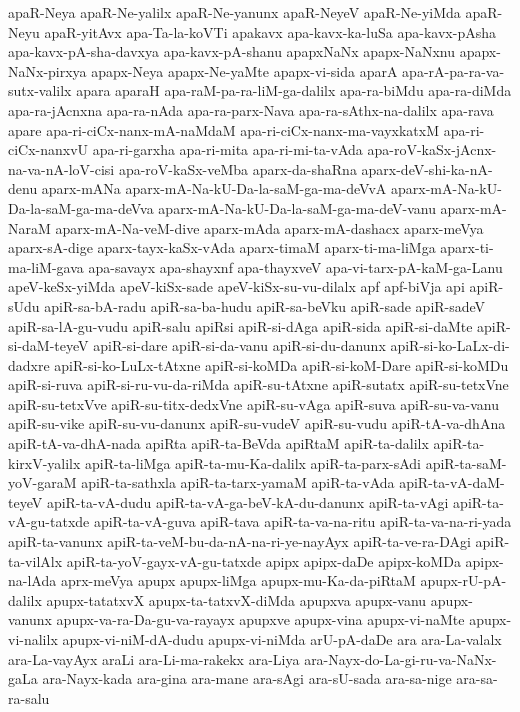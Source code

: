 {apaR-Neya
apaR-Ne-yalilx
apaR-Ne-yanunx
apaR-NeyeV
apaR-Ne-yiMda
apaR-Neyu
apaR-yitAvx
apa-Ta-la-koVTi
apakavx
apa-kavx-ka-luSa
apa-kavx-pAsha
apa-kavx-pA-sha-davxya
apa-kavx-pA-shanu
apapxNaNx
apapx-NaNxnu
apapx-NaNx-pirxya
apapx-Neya
apapx-Ne-yaMte
apapx-vi-sida
aparA
apa-rA-pa-ra-va-sutx-valilx
apara
aparaH
apa-raM-pa-ra-liM-ga-dalilx
apa-ra-biMdu
apa-ra-diMda
apa-ra-jAcnxna
apa-ra-nAda
apa-ra-parx-Nava
apa-ra-sAthx-na-dalilx
apa-rava
apare
apa-ri-ciCx-nanx-mA-naMdaM
apa-ri-ciCx-nanx-ma-vayxkatxM
apa-ri-ciCx-nanxvU
apa-ri-garxha
apa-ri-mita
apa-ri-mi-ta-vAda
apa-roV-kaSx-jAcnx-na-va-nA-loV-cisi
apa-roV-kaSx-veMba
aparx-da-shaRna
aparx-deV-shi-ka-nA-denu
aparx-mANa
aparx-mA-Na-kU-Da-la-saM-ga-ma-deVvA
aparx-mA-Na-kU-Da-la-saM-ga-ma-deVva
aparx-mA-Na-kU-Da-la-saM-ga-ma-deV-vanu
aparx-mA-NaraM
aparx-mA-Na-veM-dive
aparx-mAda
aparx-mA-dashacx
aparx-meVya
aparx-sA-dige
aparx-tayx-kaSx-vAda
aparx-timaM
aparx-ti-ma-liMga
aparx-ti-ma-liM-gava
apa-savayx
apa-shayxnf
apa-thayxveV
apa-vi-tarx-pA-kaM-ga-Lanu
apeV-keSx-yiMda
apeV-kiSx-sade
apeV-kiSx-su-vu-dilalx
apf
apf-biVja
api
apiR-sUdu
apiR-sa-bA-radu
apiR-sa-ba-hudu
apiR-sa-beVku
apiR-sade
apiR-sadeV
apiR-sa-lA-gu-vudu
apiR-salu
apiRsi
apiR-si-dAga
apiR-sida
apiR-si-daMte
apiR-si-daM-teyeV
apiR-si-dare
apiR-si-da-vanu
apiR-si-du-danunx
apiR-si-ko-LaLx-di-dadxre
apiR-si-ko-LuLx-tAtxne
apiR-si-koMDa
apiR-si-koM-Dare
apiR-si-koMDu
apiR-si-ruva
apiR-si-ru-vu-da-riMda
apiR-su-tAtxne
apiR-sutatx
apiR-su-tetxVne
apiR-su-tetxVve
apiR-su-titx-dedxVne
apiR-su-vAga
apiR-suva
apiR-su-va-vanu
apiR-su-vike
apiR-su-vu-danunx
apiR-su-vudeV
apiR-su-vudu
apiR-tA-va-dhAna
apiR-tA-va-dhA-nada
apiRta
apiR-ta-BeVda
apiRtaM
apiR-ta-dalilx
apiR-ta-kirxV-yalilx
apiR-ta-liMga
apiR-ta-mu-Ka-dalilx
apiR-ta-parx-sAdi
apiR-ta-saM-yoV-garaM
apiR-ta-sathxla
apiR-ta-tarx-yamaM
apiR-ta-vAda
apiR-ta-vA-daM-teyeV
apiR-ta-vA-dudu
apiR-ta-vA-ga-beV-kA-du-danunx
apiR-ta-vAgi
apiR-ta-vA-gu-tatxde
apiR-ta-vA-guva
apiR-tava
apiR-ta-va-na-ritu
apiR-ta-va-na-ri-yada
apiR-ta-vanunx
apiR-ta-veM-bu-da-nA-na-ri-ye-nayAyx
apiR-ta-ve-ra-DAgi
apiR-ta-vilAlx
apiR-ta-yoV-gayx-vA-gu-tatxde
apipx
apipx-daDe
apipx-koMDa
apipx-na-lAda
aprx-meVya
apupx
apupx-liMga
apupx-mu-Ka-da-piRtaM
apupx-rU-pA-dalilx
apupx-tatatxvX
apupx-ta-tatxvX-diMda
apupxva
apupx-vanu
apupx-vanunx
apupx-va-ra-Da-gu-va-rayayx
apupxve
apupx-vina
apupx-vi-naMte
apupx-vi-nalilx
apupx-vi-niM-dA-dudu
apupx-vi-niMda
arU-pA-daDe
ara
ara-La-valalx
ara-La-vayAyx
araLi
ara-Li-ma-rakekx
ara-Liya
ara-Nayx-do-La-gi-ru-va-NaNx-gaLa
ara-Nayx-kada
ara-gina
ara-mane
ara-sAgi
ara-sU-sada
ara-sa-nige
ara-sa-ra-salu
}
